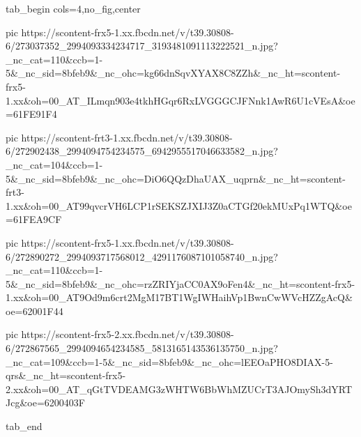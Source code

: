  
 
 
 
 


\ifcmt
  tab_begin cols=4,no_fig,center

     pic https://scontent-frx5-1.xx.fbcdn.net/v/t39.30808-6/273037352_2994093334234717_3193481091113222521_n.jpg?_nc_cat=110&ccb=1-5&_nc_sid=8bfeb9&_nc_ohc=kg66dnSqvXYAX8C8ZZh&_nc_ht=scontent-frx5-1.xx&oh=00_AT_ILmqn903e4tkhHGqr6RxLVGGGCJFNnk1AwR6U1cVEsA&oe=61FE91F4

     pic https://scontent-frt3-1.xx.fbcdn.net/v/t39.30808-6/272902438_2994094754234575_6942955517046633582_n.jpg?_nc_cat=104&ccb=1-5&_nc_sid=8bfeb9&_nc_ohc=DiO6QQzDhaUAX_uqprn&_nc_ht=scontent-frt3-1.xx&oh=00_AT99qvcrVH6LCP1rSEKSZJXIJ3Z0aCTGf20ekMUxPq1WTQ&oe=61FEA9CF

     pic https://scontent-frx5-1.xx.fbcdn.net/v/t39.30808-6/272890272_2994093717568012_4291176087101058740_n.jpg?_nc_cat=110&ccb=1-5&_nc_sid=8bfeb9&_nc_ohc=rzZRIYjaCC0AX9oFen4&_nc_ht=scontent-frx5-1.xx&oh=00_AT9Od9m6crt2MgM17BT1WgIWHaihVp1BwnCwWVcHZZgAcQ&oe=62001F44

     pic https://scontent-frx5-2.xx.fbcdn.net/v/t39.30808-6/272867565_2994094654234585_5813165143536135750_n.jpg?_nc_cat=109&ccb=1-5&_nc_sid=8bfeb9&_nc_ohc=lEEOaPHO8DIAX-5-qrs&_nc_ht=scontent-frx5-2.xx&oh=00_AT_qGtTVDEAMG3zWHTW6BbWhMZUCrT3AJOmySh3dYRTJcg&oe=6200403F

  tab_end
\fi
